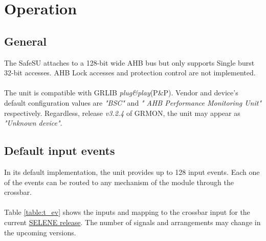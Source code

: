 \section{Operation}
\label{chapter2}
\subsection{General}
The SafeSU attaches to a 128-bit wide AHB bus but only supports Single burst 32-bit accesses. AHB Lock accesses and protection control are not implemented.\\
\\
The unit is compatible with GRLIB \textit{plug\&play}(P\&P). Vendor and device's default configuration values are  \textit{"BSC"} and \textit{" AHB Performance Monitoring Unit"} respectively. Regardless, release  \textit{v3.2.4}  of GRMON, the unit may appear as \textit{"Unknown device"}.
\subsection{Default input events}
In its default implementation, the unit provides up to 128 input events. Each one of the events can be routed to any mechanism of the module through the crossbar.\\
\\
Table \ref{table:t_ev} shows the inputs and mapping to the crossbar input for the current \href{https://gitlab.bsc.es/selene/selene-hardware/-/merge_requests/2}{SELENE release}. The number of signals and arrangements may change in the upcoming versions. \\

